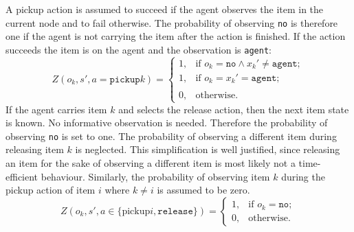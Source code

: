 A pickup action is assumed to succeed if the agent observes the item in the current node and to fail otherwise. The probability of observing \texttt{no} is therefore one if the agent is not carrying the item after the action is finished. If the action succeeds the item is on the agent and the observation is \texttt{agent}:
\begin{equation}\label{eq:pickup}
    Z(o_k, s', a=\texttt{pickup}k) = \begin{cases}
    1, &\text{if } o_k=\texttt{no} \land x_k'\neq \texttt{agent};\\
    1,& \text{if }o_k=x_k'=\texttt{agent};\\
    \\0, &\text{otherwise}. \end{cases}
\end{equation}
If the agent carries item $k$ and selects the release action, then the next item state is known. No informative observation is needed. Therefore the probability of observing \texttt{no} is set to one. The probability of observing a different item during releasing item $k$ is neglected. This simplification is well justified, since releasing an item for the sake of observing a different item is most likely not a time-efficient behaviour. Similarly, the probability of observing item $k$ during the pickup action of item $i$ where $k\neq i$ is assumed to be zero. 
\begin{equation}\label{eq:Orelease}
    Z(o_k, s', a\in\{\text{pickup}i, \texttt{release}\}) = \begin{cases}
    1,& \text{if } o_k=\texttt{no};\\
    0,& \text{otherwise}.\end{cases}
\end{equation}
